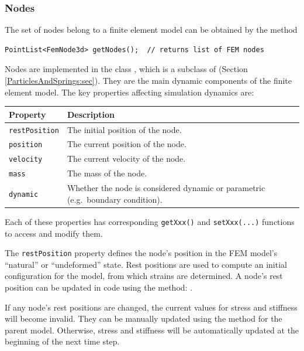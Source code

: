 \subsubsection{Nodes}
\ifLaTeXML{\newline}

The set of nodes belong to a finite element model can be obtained by the method
\begin{lstlisting}[]
PointList<FemNode3d> getNodes();  // returns list of FEM nodes
\end{lstlisting}
Nodes are implemented in the class 
, which is a subclass of 
 (Section 
\ref{ParticlesAndSprings:sec}).  They are the main dynamic components of
the finite element model.  The key properties affecting simulation dynamics
are:
\begin{center}
\begin{tabular}{|ll|}
  \hline
  Property & Description\\
  \hline
  {\tt restPosition} & The initial position of the node.\\
  {\tt position} & The current position of the node.\\
  {\tt velocity} & The current velocity of the node.\\
  {\tt mass} & The mass of the node.\\
  {\tt dynamic} & Whether the node is considered dynamic or parametric 
                  (e.g.~boundary condition).\\
  \hline
\end{tabular}
\end{center}
Each of these properties has corresponding {\tt getXxx()} and 
{\tt setXxx(...)} functions to access and modify them.

The {\tt restPosition} property defines the node's position in the FEM model's 
``natural'' or ``undeformed'' state.  Rest positions are used to compute
an initial configuration for the model, from which strains are determined.  A
node's rest position can be updated in code using the method:
.

\begin{sideblock}
If any node's rest positions are changed, the current values 
for stress and stiffness will become invalid.  They can be manually
updated using the method  for the parent model. Otherwise,
stress and stiffness will be automatically updated at the beginning of the 
next time step. 
\end{sideblock}

